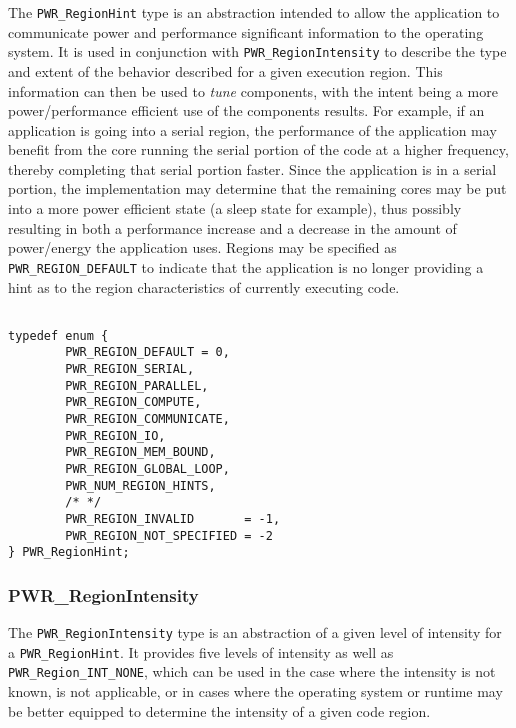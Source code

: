 \documentclass[12pt]{report} %
\providecommand{\DIFdeltex}[1]{{\protect\color{red}\sout{#1}}}                      %
\providecommand{\DIFaddbegin}{} %
\providecommand{\DIFaddend}{} %
\providecommand{\DIFdelbegin}{} %
\providecommand{\DIFdelend}{} %
\providecommand{\DIFdel}[1]{\texorpdfstring{\DIFdeltex{#1}}{}} %
\newcommand{\DIFscaledelfig}{0.5}
\newlength{\DIFdelgraphicswidth} %
\newlength{\DIFdelgraphicsheight} %
\newcommand{\DIFaddincludegraphics}[2][]{{\color{blue}\fbox{\DIFOincludegraphics[#1]{#2}}}} %
\newcommand{\DIFdelincludegraphics}[2][]{%
\sbox{\DIFdelgraphicsbox}{\DIFOincludegraphics[#1]{#2}}%
\settoboxwidth{\DIFdelgraphicswidth}{\DIFdelgraphicsbox} %
\settoboxtotalheight{\DIFdelgraphicsheight}{\DIFdelgraphicsbox} %
\scalebox{\DIFscaledelfig}{%
\parbox[b]{\DIFdelgraphicswidth}{\usebox{\DIFdelgraphicsbox}\\[-\baselineskip] \rule{\DIFdelgraphicswidth}{0em}}\llap{\resizebox{\DIFdelgraphicswidth}{\DIFdelgraphicsheight}{%
\setlength{\unitlength}{\DIFdelgraphicswidth}%
\begin{picture}(1,1)%
\thicklines\linethickness{2pt} %
{\color[rgb]{1,0,0}\put(0,0){\framebox(1,1){}}}%
{\color[rgb]{1,0,0}\put(0,0){\line( 1,1){1}}}%
{\color[rgb]{1,0,0}\put(0,1){\line(1,-1){1}}}%
\end{picture}%
}\hspace*{3pt}}} %
} %
\DeclareRobustCommand{\DIFaddbegin}{\DIFOaddbegin \let\includegraphics\DIFaddincludegraphics} %
\DeclareRobustCommand{\DIFaddend}{\DIFOaddend \let\includegraphics\DIFOincludegraphics} %
\DeclareRobustCommand{\DIFdelbegin}{\DIFOdelbegin \let\includegraphics\DIFdelincludegraphics} %
\DeclareRobustCommand{\DIFdelend}{\DIFOaddend \let\includegraphics\DIFOincludegraphics} %
\begin{document}
The  \texttt{PWR_RegionHint} type is an abstraction intended to allow the application to communicate power and performance significant information to the operating system. It is used in conjunction with \texttt{PWR_RegionIntensity} to describe the type and extent of the behavior described for a given execution region. 
This information can then be used to \textit{tune} components, with the intent being a more power/performance efficient use of the components results. 
For example, if an application is going into a serial region, the performance of the application may benefit from the core running the serial portion of the code at a higher frequency, thereby completing that serial portion faster. 
Since the application is in a serial portion, the implementation may determine that the remaining cores may be put into a more power efficient state (a sleep state for example), thus possibly resulting in both a performance increase and a decrease in the amount of power/energy the application uses.
Regions may be specified as \texttt{PWR_REGION_DEFAULT} to indicate that the application is no longer providing a hint as to the region characteristics of currently executing code.

\begin{center}
\begin{minipage}{.95\linewidth}%
\begin{lstlisting}

typedef enum {
        PWR_REGION_DEFAULT = 0,
        PWR_REGION_SERIAL,
        PWR_REGION_PARALLEL,
        PWR_REGION_COMPUTE,
        PWR_REGION_COMMUNICATE,
        PWR_REGION_IO,
        PWR_REGION_MEM_BOUND,
        PWR_REGION_GLOBAL_LOOP,
        PWR_NUM_REGION_HINTS,
        /* */
        PWR_REGION_INVALID       = -1,
        PWR_REGION_NOT_SPECIFIED = -2
} PWR_RegionHint;

\end{lstlisting}
\end{minipage}
\end{center}


\subsubsection{PWR_RegionIntensity}\label{type:RegionIntensity}

The \texttt{PWR_RegionIntensity} type is an abstraction of a given level of intensity for a \DIFdelbegin \DIFdel{}\DIFdelend \DIFaddbegin \texttt{PWR_RegionHint}\DIFaddend .
It provides five levels of intensity as well as \texttt{PWR_Region_INT_NONE}, which can be used in the case where
the intensity is not known, is not applicable, or in cases where the operating system or runtime may be better
equipped to determine the intensity of a given code region.
\end{document}
